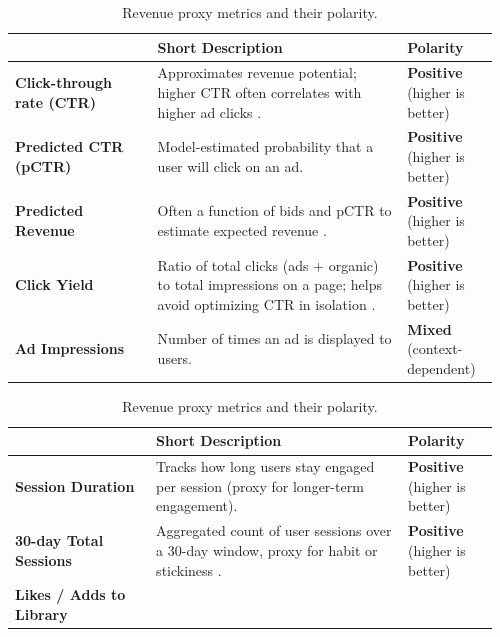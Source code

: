 \documentclass[manuscript,review,screen]{acmart}
\begin{document}
\begin{table}[H]
\centering
\footnotesize
\renewcommand{\arraystretch}{1.15}
\setlength{\tabcolsep}{4pt}
\begin{tabularx}{\linewidth}{>{\raggedright\arraybackslash}p{0.29\linewidth} >{\raggedright\arraybackslash}p{0.49\linewidth} >{\raggedright\arraybackslash}p{0.18\linewidth}}
\toprule
{\bfseries Proxy Metric} & {\bfseries Short Description} & {\bfseries Polarity} \\
\midrule
\textbf{Click-through rate (CTR)}
    & Approximates revenue potential; higher CTR often correlates with higher ad clicks \cite{zhang2018whole, yan2020ads, zhao2020jointly}.
    & \textbf{Positive} (higher is better) \\
\textbf{Predicted CTR (pCTR)}
    & Model-estimated probability that a user will click on an ad.
    & \textbf{Positive} (higher is better) \\
\textbf{Predicted Revenue}
    & Often a function of bids and pCTR to estimate expected revenue \cite{yan2020ads, zhang2018whole}.
    & \textbf{Positive} (higher is better) \\
\textbf{Click Yield}
    & Ratio of total clicks (ads + organic) to total impressions on a page; helps avoid optimizing CTR in isolation \cite{zhang2018whole}.
    & \textbf{Positive} (higher is better) \\
\textbf{Ad Impressions}
    & Number of times an ad is displayed to users.
    & \textbf{Mixed} (context-dependent) \\
\bottomrule
\end{tabularx}
\caption{Revenue proxy metrics and their polarity.}
\label{tab:proxy-metrics-revenue}
\vspace{0.8em}
\begin{tabularx}{\linewidth}{>{\raggedright\arraybackslash}p{0.28\linewidth} >{\raggedright\arraybackslash}p{0.50\linewidth} >{\raggedright\arraybackslash}p{0.18\linewidth}}
\toprule
{\bfseries Proxy Metric} & {\bfseries Short Description} & {\bfseries Polarity} \\
\midrule
\textbf{Session Duration}
    & Tracks how long users stay engaged per session (proxy for longer-term engagement).
    & \textbf{Positive} (higher is better) \\
\textbf{30-day Total Sessions}
    & Aggregated count of user sessions over a 30-day window, proxy for habit or stickiness \cite{xu2023optimizing}.
    & \textbf{Positive} (higher is better) \\
\textbf{Likes / Adds to Library}

\end{tabularx}
\end{table}
\end{document}
